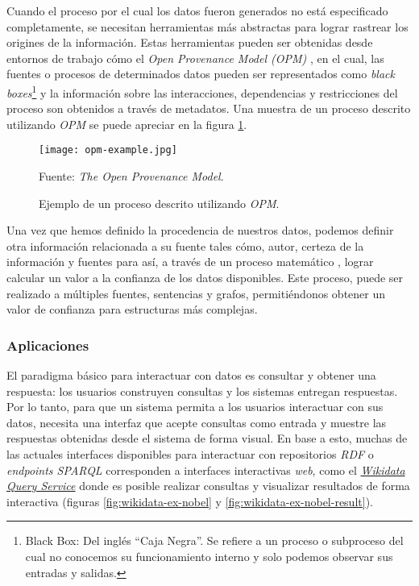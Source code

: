 Cuando el proceso por el cual los datos fueron generados no está especificado
completamente, se necesitan herramientas más abstractas para lograr rastrear los
origines de la información. Estas herramientas pueden ser obtenidas desde
entornos de trabajo cómo el \textit{Open Provenance Model (OPM)}
\cite{moreau2008open}, en el cual, las fuentes o procesos de determinados datos
pueden ser representados como \textit{black boxes}\footnote{Black Box: Del
inglés ``Caja Negra''. Se refiere a un proceso o subproceso del cual no
conocemos su funcionamiento interno y solo podemos observar sus entradas y
salidas.} y la información sobre las interacciones, dependencias y
restricciones del proceso son obtenidos a través de metadatos. Una muestra de un
proceso descrito utilizando \textit{OPM} se puede apreciar en la figura
\ref{fig:opm-example}.

\begin{figure}
    \centering
    \texttt{[image: opm-example.jpg]}
    \caption{Ejemplo de un proceso descrito utilizando \textit{OPM}.} Fuente:
    \textit{The Open Provenance Model}.
    \label{fig:opm-example}
\end{figure}

Una vez que hemos definido la procedencia de nuestros datos, podemos definir
otra información relacionada a su fuente tales cómo, autor, certeza de la
información y fuentes para así, a través de un proceso matemático
\cite{dividino2009provenance}, lograr calcular un valor a la confianza de los
datos disponibles. Este proceso, puede ser realizado a múltiples fuentes,
sentencias y grafos, permitiéndonos obtener un valor de confianza para
estructuras más complejas.

\subsubsection{Aplicaciones}
\label{sec:aplicaciones}

El paradigma básico para interactuar con datos es consultar y obtener una
respuesta: los usuarios construyen consultas y los sistemas entregan respuestas.
Por lo tanto, para que un sistema permita a los usuarios interactuar con sus
datos, necesita una interfaz que acepte consultas como entrada y muestre las
respuestas obtenidas desde el sistema de forma visual. En base a esto, muchas de
las actuales interfaces disponibles para interactuar con repositorios
\textit{RDF} o \textit{endpoints SPARQL} corresponden a interfaces interactivas
\textit{web}, como el \href{https://query.wikidata.org}{\textit{Wikidata Query
Service}} donde es posible realizar consultas y visualizar resultados de forma
interactiva (figuras \ref{fig:wikidata-ex-nobel} y
\ref{fig:wikidata-ex-nobel-result}).


